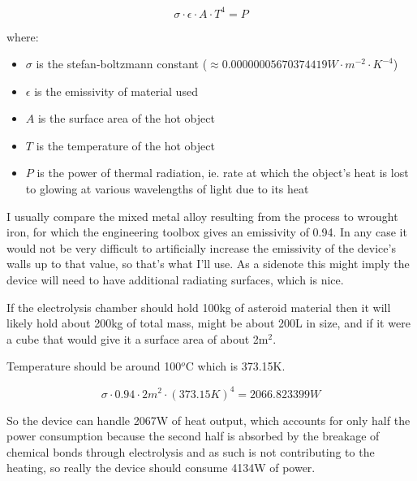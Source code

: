 \documentclass[a4paper]{article}
\begin{document}
    $$ \sigma \cdot \epsilon \cdot A \cdot T^4 = P $$
    
    where:
    
    \begin{itemize}
    	\item $\sigma$ is the stefan-boltzmann constant ($\approx 0.00000005670374419 W \cdot m^{-2} \cdot K^{-4} $)
    	
    	\item $\epsilon$ is the emissivity of material used
    	
    	\item $A$ is the surface area of the hot object
    	
    	\item $T$ is the temperature of the hot object
    	
    	\item $P$ is the power of thermal radiation, ie. rate at which the object's heat is lost to glowing at various wavelengths of light due to its heat
    \end{itemize}
    
    I usually compare the mixed metal alloy resulting from the process to wrought iron, for which the engineering toolbox gives an emissivity of 0.94.
    In any case it would not be very difficult to artificially increase the emissivity of the device's walls up to that value, so that's what I'll use.
    As a sidenote this might imply the device will need to have additional radiating surfaces, which is nice.
    
    \medskip
    
    If the electrolysis chamber should hold 100kg of asteroid material then it will likely hold about 200kg of total mass, might be about 200L in size, and if it were a cube that would give it a surface area of about 2m$^2$.
    
    \medskip
    
    Temperature should be around 100$^o$C which is 373.15K.
    
    \medskip
    
    $$ \sigma \cdot 0.94 \cdot 2m^2 \cdot (373.15K)^4 = 2066.823399 W $$
    
    \medskip
    
    So the device can handle 2067W of heat output, which accounts for only half the power consumption because the second half is absorbed by the breakage of chemical bonds through electrolysis and as such is not contributing to the heating, so really the device should consume 4134W of power.
    
\end{document}
